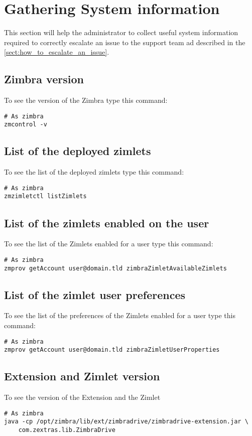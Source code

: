 \section{Gathering System information}
\label{==sect:gatheringinfo==}

This section will help the administrator to collect useful system information
required to correctly escalate an issue to the support team ad described in the
\autoref{sect:how_to_escalate_an_issue}.

    \subsection{Zimbra version}
    \label{==sect:gatheringinfo-zversion==}
        To see the version of the Zimbra type this command:
        \begin{verbatim}
# As zimbra
zmcontrol -v
        \end{verbatim}

    \subsection{List of the deployed zimlets}
    \label{==sect:gatheringinfo-listzimlets==}
        To see the list of the deployed zimlets type this command:
        \begin{verbatim}
# As zimbra
zmzimletctl listZimlets
        \end{verbatim}

    \subsection{List of the zimlets enabled on the user}
    \label{==sect:gatheringinfo-userzimlets==}
        To see the list of the Zimlets enabled for a user type this command:
        \begin{verbatim}
# As zimbra
zmprov getAccount user@domain.tld zimbraZimletAvailableZimlets
        \end{verbatim}

    \subsection{List of the zimlet user preferences}
    \label{==sect:gatheringinfo-userzimlets-pref==}
        To see the list of the preferences of the Zimlets enabled for a user type this command:
        \begin{verbatim}
# As zimbra
zmprov getAccount user@domain.tld zimbraZimletUserProperties
        \end{verbatim}

    \subsection{Extension and Zimlet version}
    \label{==sect:gatheringinfo-extension==}
        To see the version of the Extension and the Zimlet
        \begin{verbatim}
# As zimbra
java -cp /opt/zimbra/lib/ext/zimbradrive/zimbradrive-extension.jar \
    com.zextras.lib.ZimbraDrive
        \end{verbatim}
